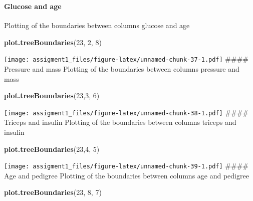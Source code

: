 \documentclass[
]{article}
\newenvironment{Shaded}{\begin{snugshade}}{\end{snugshade}}
\newcommand{\DecValTok}[1]{\textcolor[rgb]{0.00,0.00,0.81}{#1}}
\newcommand{\KeywordTok}[1]{\textcolor[rgb]{0.13,0.29,0.53}{\textbf{#1}}}
\newcommand{\NormalTok}[1]{#1}
\begin{document}
\hypertarget{section-5}{%
\subsubsection{}\label{section-5}}

\hypertarget{glucose-and-age-2}{%
\paragraph{Glucose and age}\label{glucose-and-age-2}}

Plotting of the boundaries between columns glucose and age

\begin{Shaded}
\begin{Highlighting}[]
\KeywordTok{plot.treeBoundaries}\NormalTok{(}\DecValTok{23}\NormalTok{, }\DecValTok{2}\NormalTok{, }\DecValTok{8}\NormalTok{)}
\end{Highlighting}
\end{Shaded}

\texttt{[image: assigment1\_files/figure-latex/unnamed-chunk-37-1.pdf]}
\#\#\#\# Pressure and mass Plotting of the boundaries between columns
pressure and mass

\begin{Shaded}
\begin{Highlighting}[]
\KeywordTok{plot.treeBoundaries}\NormalTok{(}\DecValTok{23}\NormalTok{,}\DecValTok{3}\NormalTok{, }\DecValTok{6}\NormalTok{)}
\end{Highlighting}
\end{Shaded}

\texttt{[image: assigment1\_files/figure-latex/unnamed-chunk-38-1.pdf]}
\#\#\#\# Triceps and insulin Plotting of the boundaries between columns
triceps and insulin

\begin{Shaded}
\begin{Highlighting}[]
\KeywordTok{plot.treeBoundaries}\NormalTok{(}\DecValTok{23}\NormalTok{,}\DecValTok{4}\NormalTok{, }\DecValTok{5}\NormalTok{)}
\end{Highlighting}
\end{Shaded}

\texttt{[image: assigment1\_files/figure-latex/unnamed-chunk-39-1.pdf]}
\#\#\#\# Age and pedigree Plotting of the boundaries between columns age
and pedigree

\begin{Shaded}
\begin{Highlighting}[]
\KeywordTok{plot.treeBoundaries}\NormalTok{(}\DecValTok{23}\NormalTok{, }\DecValTok{8}\NormalTok{, }\DecValTok{7}\NormalTok{)}
\end{Highlighting}
\end{Shaded}
\end{document}
